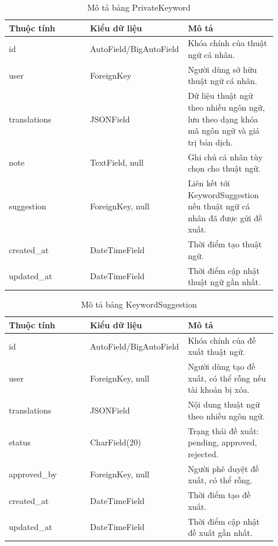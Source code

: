 ﻿\documentclass[../DoAn.tex]{subfiles}
\begin{document}
\begin{table}[H]
\centering
\caption{Mô tả bảng PrivateKeyword}
\label{table:db-private-keyword}
\small
\setlength{\tabcolsep}{4pt}
\renewcommand{\arraystretch}{1.18}
\begin{tabular}{|p{0.30\linewidth}|p{0.27\linewidth}|p{0.33\linewidth}|}
\hline
\textbf{Thuộc tính} & \textbf{Kiểu dữ liệu} & \textbf{Mô tả} \\ \hline
id & AutoField/BigAutoField & Khóa chính của thuật ngữ cá nhân. \\ \hline
user & ForeignKey & Người dùng sở hữu thuật ngữ cá nhân. \\ \hline
translations & JSONField & Dữ liệu thuật ngữ theo nhiều ngôn ngữ, lưu theo dạng khóa mã ngôn ngữ và giá trị bản dịch. \\ \hline
note & TextField, null & Ghi chú cá nhân tùy chọn cho thuật ngữ. \\ \hline
suggestion & ForeignKey, null & Liên kết tới KeywordSuggestion nếu thuật ngữ cá nhân đã được gửi đề xuất. \\ \hline
created\_\allowbreak at & DateTimeField & Thời điểm tạo thuật ngữ. \\ \hline
updated\_\allowbreak at & DateTimeField & Thời điểm cập nhật thuật ngữ gần nhất. \\ \hline
\end{tabular}
\end{table}

\begin{table}[H]
\centering
\caption{Mô tả bảng KeywordSuggestion}
\label{table:db-keyword-suggestion}
\small
\setlength{\tabcolsep}{4pt}
\renewcommand{\arraystretch}{1.18}
\begin{tabular}{|p{0.30\linewidth}|p{0.27\linewidth}|p{0.33\linewidth}|}
\hline
\textbf{Thuộc tính} & \textbf{Kiểu dữ liệu} & \textbf{Mô tả} \\ \hline
id & AutoField/BigAutoField & Khóa chính của đề xuất thuật ngữ. \\ \hline
user & ForeignKey, null & Người dùng tạo đề xuất, có thể rỗng nếu tài khoản bị xóa. \\ \hline
translations & JSONField & Nội dung thuật ngữ theo nhiều ngôn ngữ. \\ \hline
status & CharField(20) & Trạng thái đề xuất: pending, approved, rejected. \\ \hline
approved\_\allowbreak by & ForeignKey, null & Người phê duyệt đề xuất, có thể rỗng. \\ \hline
created\_\allowbreak at & DateTimeField & Thời điểm tạo đề xuất. \\ \hline
updated\_\allowbreak at & DateTimeField & Thời điểm cập nhật đề xuất gần nhất. \\ \hline
\end{tabular}
\end{table}
\end{document}
